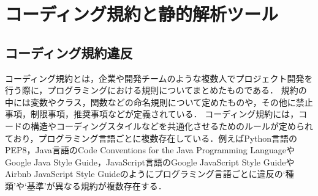 \documentclass[submit,noauthor,ses,dvipdfmx]{ipsj}
\begin{document}
\section{コーディング規約と静的解析ツール}\label{chap:background}

\subsection{コーディング規約違反}






コーディング規約とは，企業や開発チームのような複数人でプロジェクト開発を行う際に，プログラミングにおける規則についてまとめたものである．
規約の中には変数やクラス，関数などの命名規則について定めたものや，その他に禁止事項，制限事項，推奨事項などが定義されている．
コーディング規約には，コードの構造やコーディングスタイルなどを共通化させるためのルールが定められており，プログラミング言語ごとに複数存在している．例えばPython言語のPEP8，Java言語のCode Conventions for the Java Programming LanguageやGoogle Java Style Guide，JavaScript言語のGoogle JavaScript Style GuideやAirbnb JavaScript Style Guideのようにプログラミング言語ごとに違反の`種類'や`基準'が異なる規約が複数存在する．
\end{document}
